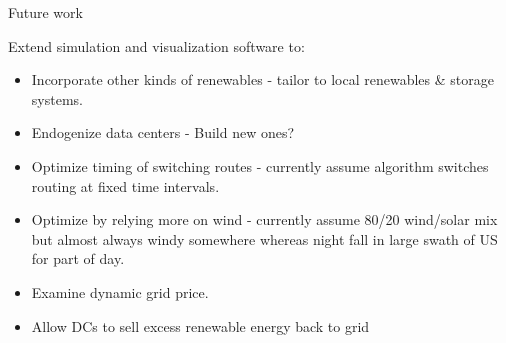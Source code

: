 \documentclass[xcolor=dvipsnames]{beamer}
\begin{document}
\begin{frame}{Future work}

Extend simulation and visualization software to:

\begin{itemize}
\item Incorporate other kinds of renewables - tailor to local renewables \& storage systems.
\item Endogenize data centers - Build new ones? 
\item Optimize timing of switching routes - currently assume algorithm switches routing at fixed time intervals. 
\item Optimize by relying more on wind - currently assume 80/20 wind/solar mix but almost always windy somewhere whereas night fall in large swath of US for part of day. 
\item Examine dynamic grid price.  
\item Allow DCs to sell excess renewable energy back to grid
\end{itemize}

\end{frame}
\end{document}
